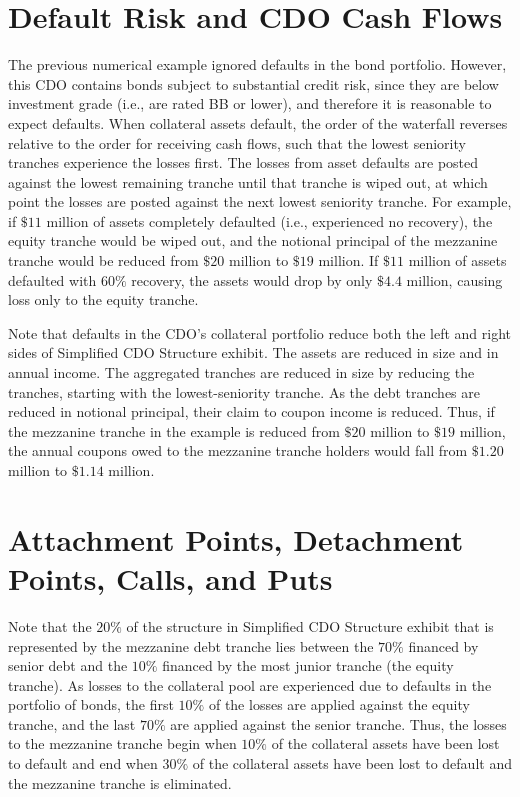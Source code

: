 \documentclass[11pt]{article}
\begin{document}
\section*{Default Risk and CDO Cash Flows}
The previous numerical example ignored defaults in the bond portfolio. However, this CDO contains bonds subject to substantial credit risk, since they are below investment grade (i.e., are rated BB or lower), and therefore it is reasonable to expect defaults. When collateral assets default, the order of the waterfall reverses relative to the order for receiving cash flows, such that the lowest seniority tranches experience the losses first. The losses from asset defaults are posted against the lowest remaining tranche until that tranche is wiped out, at which point the losses are posted against the next lowest seniority tranche. For example, if $\$ 11$ million of assets completely defaulted (i.e., experienced no recovery), the equity tranche would be wiped out, and the notional principal of the mezzanine tranche would be reduced from $\$ 20$ million to $\$ 19$ million. If $\$ 11$ million of assets defaulted with $60 \%$ recovery, the assets would drop by only $\$ 4.4$ million, causing loss only to the equity tranche.

Note that defaults in the CDO's collateral portfolio reduce both the left and right sides of Simplified CDO Structure exhibit. The assets are reduced in size and in annual income. The aggregated tranches are reduced in size by reducing the tranches, starting with the lowest-seniority tranche. As the debt tranches are reduced in notional principal, their claim to coupon income is reduced. Thus, if the mezzanine tranche in the example is reduced from $\$ 20$ million to $\$ 19$ million, the annual coupons owed to the mezzanine tranche holders would fall from $\$ 1.20$ million to $\$ 1.14$ million.

\section*{Attachment Points, Detachment Points, Calls, and Puts}
Note that the $20 \%$ of the structure in Simplified CDO Structure exhibit that is represented by the mezzanine debt tranche lies between the $70 \%$ financed by senior debt and the $10 \%$ financed by the most junior tranche (the equity tranche). As losses to the collateral pool are experienced due to defaults in the portfolio of bonds, the first $10 \%$ of the losses are applied against the equity tranche, and the last $70 \%$ are applied against the senior tranche. Thus, the losses to the mezzanine tranche begin when $10 \%$ of the collateral assets have been lost to default and end when $30 \%$ of the collateral assets have been lost to default and the mezzanine tranche is eliminated.
\end{document}
